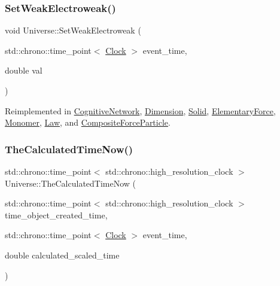 \subsubsection{\texorpdfstring{Set\+Weak\+Electroweak()}{SetWeakElectroweak()}}
{\footnotesize\ttfamily void Universe\+::\+Set\+Weak\+Electroweak (\begin{DoxyParamCaption}\item[{std\+::chrono\+::time\+\_\+point$<$ \mbox{\hyperlink{universe_8h_a0ef8d951d1ca5ab3cfaf7ab4c7a6fd80}{Clock}} $>$}]{event\+\_\+time,  }\item[{double}]{val }\end{DoxyParamCaption})\hspace{0.3cm}{\ttfamily [virtual]}}



Reimplemented in \mbox{\hyperlink{classCognitiveNetwork_a116f6818986a622e4a318857859e2495}{Cognitive\+Network}}, \mbox{\hyperlink{classDimension_a1d2accef9e6adf747f5cc143ae4527c9}{Dimension}}, \mbox{\hyperlink{classSolid_adb34befc66f8c681f3a85c44e0d00e3a}{Solid}}, \mbox{\hyperlink{classElementaryForce_a38d4f86f18a9f84a4198ee43bc90f6b4}{Elementary\+Force}}, \mbox{\hyperlink{classMonomer_ab887d7cfd2ecb557efb3ace59852019c}{Monomer}}, \mbox{\hyperlink{classLaw_a65e5e757041c1e72bb046eccbb6d66db}{Law}}, and \mbox{\hyperlink{classCompositeForceParticle_a73a3792ae1c334e74f945fea56083f0b}{Composite\+Force\+Particle}}.

\mbox{\label{classUniverse_aa220508c4cc12b02c6fe494622ebb58d}} 
\subsubsection{\texorpdfstring{The\+Calculated\+Time\+Now()}{TheCalculatedTimeNow()}}
{\footnotesize\ttfamily std\+::chrono\+::time\+\_\+point$<$ std\+::chrono\+::high\+\_\+resolution\+\_\+clock $>$ Universe\+::\+The\+Calculated\+Time\+Now (\begin{DoxyParamCaption}\item[{std\+::chrono\+::time\+\_\+point$<$ std\+::chrono\+::high\+\_\+resolution\+\_\+clock $>$}]{time\+\_\+object\+\_\+created\+\_\+time,  }\item[{std\+::chrono\+::time\+\_\+point$<$ \mbox{\hyperlink{universe_8h_a0ef8d951d1ca5ab3cfaf7ab4c7a6fd80}{Clock}} $>$}]{event\+\_\+time,  }\item[{double}]{calculated\+\_\+scaled\+\_\+time }\end{DoxyParamCaption})}

